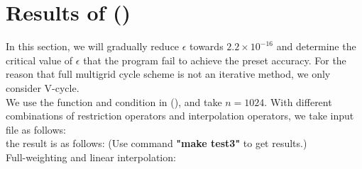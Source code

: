 \documentclass[a4paper,twocolumn]{article}
\theoremstyle{definition}
\begin{document}
\section{Results of (\uppercase\expandafter{})}
In this section, we will gradually reduce $\epsilon$ towards $2.2\times10^{-16}$ and determine the critical value of $\epsilon$ that the program fail to achieve the preset accuracy. For the reason that full multigrid cycle scheme is not an iterative method, we only consider V-cycle.\\
We use the function and condition in (\uppercase\expandafter{}), and take $n = 1024$. With different combinations of restriction operators and interpolation operators, we take input file as follows: 
\\
the result is as follows: (Use command \textbf{"make test3"} to get results.)\\
Full-weighting and linear interpolation:
\end{document}
